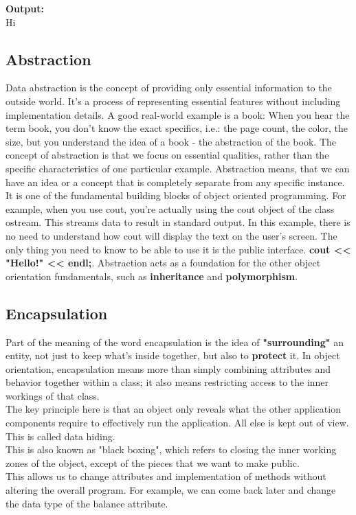 \documentclass[12pt , a4paper]{article}
\newcommand{\hl}[1]{\colorbox{coolblack}{\color{cream}\textbf{#1}\color{black}}}
\begin{document}
	\begin{tcolorbox}
	\textbf{Output:}\\
	Hi
	\end{tcolorbox}

	\subsection{Abstraction}
	Data abstraction is the concept of providing only essential information to the outside world. It's a process of representing essential features without including implementation details. A good real-world example is a book: When you hear the term book, you don't know the exact specifics, i.e.: the page count, the color, 	the size, but you understand the idea of a book - the abstraction of the book. The concept of abstraction is that we focus on essential qualities, rather than the specific characteristics of one particular example. Abstraction means, that we can have an idea or a concept that is completely separate from any specific instance.
It is one of the fundamental building blocks of object oriented programming. For example, when you use cout, you're actually using the cout object of the class ostream. This streams data to result in standard output. In this example, there is no need to understand how cout will display the text on the user's screen. The only thing you need to know to be able to use it is the public interface. \hl{cout << "Hello!" << endl;}. Abstraction acts as a foundation for the other object orientation fundamentals, such as \textbf{inheritance} and \textbf{polymorphism}.

	\subsection{Encapsulation}
	Part of the meaning of the word encapsulation is the idea of \textbf{"surrounding"} an entity, not just to keep what's inside together, but also to \textbf{protect} it.
	In object orientation, encapsulation means more than simply combining attributes and behavior together within a class; it also means restricting access to the inner workings of that class.\\
	The key principle here is that an object only reveals what the other application components require to effectively run the application. All else is kept out of view.
	This is called data hiding.\\
	This is also known as "black boxing", which refers to closing the inner working zones of the object, except of the pieces that we want to make public.\\
	This allows us to change attributes and implementation of methods without altering the overall program. For example, we can come back later and change the data type of the balance attribute.\\
\end{document}
